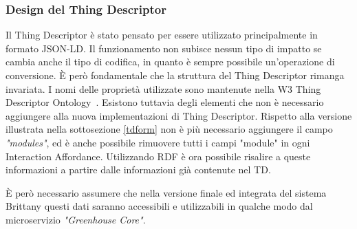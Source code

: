 \subsubsection{Design del Thing Descriptor}
Il Thing Descriptor è stato pensato per essere utilizzato principalmente in formato JSON-LD. Il funzionamento non subisce nessun tipo di impatto se cambia anche il tipo di codifica, in quanto è sempre possibile un'operazione di conversione. È però fondamentale che la struttura del Thing Descriptor rimanga invariata. I nomi delle proprietà utilizzate sono mantenute nella W3 Thing Descriptor Ontology~\cite{ThingDes54:online}.\newline
\noindent Esistono tuttavia degli elementi che non è necessario aggiungere alla nuova implementazioni di Thing Descriptor. Rispetto alla versione illustrata nella sottosezione \ref{tdform} non è più necessario aggiungere il campo \textit{"modules"}, ed è anche possibile rimuovere tutti i campi "module" in ogni Interaction Affordance.\newline
Utilizzando RDF è ora possibile risalire a queste informazioni a partire dalle informazioni già contenute nel TD.
\begin{warn}
	È però necessario assumere che nella versione finale ed integrata del sistema Brittany questi dati saranno accessibili e utilizzabili in qualche modo dal microservizio \textit{"Greenhouse Core"}.
\end{warn}
